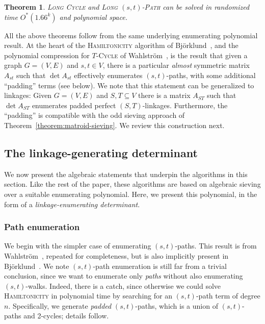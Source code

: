 \documentclass[10pt,a4paper]{article}
\newtheorem{theorem}{Theorem}[section]
\begin{document}
\begin{theorem}
  \label{thm:long-st-path}
  \textsc{Long Cycle} and \textsc{Long $(s,t)$-Path} can be solved in
  randomized time $O^*(1.66^k)$ and polynomial space.
\end{theorem}

All the above theorems follow from the same underlying enumerating
polynomial result. At the heart of the \textsc{Hamiltonicity}
algorithm of Björklund~\cite{Bjorklund14detsum},
and the polynomial compression for \textsc{$T$-Cycle} of Wahlström~\cite{Wahlstrom13STACS},
is the result that given a graph $G=(V,E)$ and $s, t \in V$, 
there is a particular \emph{almost} symmetric matrix $A_{st}$
such that $\det A_{st}$ effectively enumerates $(s,t)$-paths, with
some additional ``padding'' terms (see below).
We note that this statement can be generalized to linkages:
Given $G=(V,E)$ and $S, T \subseteq V$ there is a matrix $A_{ST}$
such that $\det A_{ST}$ enumerates padded perfect $(S,T)$-linkages. 
Furthermore, the ``padding'' is compatible with the odd sieving
approach of Theorem~\ref{theorem:matroid-sieving}. We review this
construction next.

\subsection{The linkage-generating determinant}

We now present the algebraic statements that underpin the algorithms
in this section. Like the rest of the paper, these algorithms are based on
algebraic sieving over a suitable enumerating polynomial.
Here, we present this polynomial, in the form of a
\emph{linkage-enumerating determinant}.

\subsubsection{Path enumeration}

We begin with the simpler case of enumerating $(s,t)$-paths. This result
is from Wahlström~\cite{Wahlstrom13STACS}, repeated for completeness,
but is also implicitly present in Björklund~\cite{Bjorklund14detsum}.
We note $(s,t)$-path enumeration is still far from a trivial conclusion, since we
want to enumerate only \emph{paths} without also enumerating $(s,t)$-walks.
Indeed, there is a catch, since otherwise we could solve
\textsc{Hamiltonicity} in polynomial time by searching for an
$(s,t)$-path term of degree $n$. Specifically, we generate
\emph{padded} $(s,t)$-paths, which is a union of $(s,t)$-paths and 2-cycles;
details follow.
\end{document}
